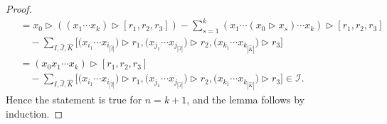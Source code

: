 \documentclass[10pt,a4paper]{amsart}
\numberwithin{equation}{section}
\begin{document}
\begin{proof}
\begin{gather*}
 \quad {}= x_0 \rhd ( (x_1 \cdots x_k) \rhd [r_1, r_2, r_3]) - \sum_{s=1}^k (x_1 \cdots (x_0 \rhd x_s) \cdots x_k) \rhd [r_1, r_2, r_3] \\
 \qquad {}- \sum_{\hat{I},\hat{J},\hat{K}} \bigl[\bigl(x_{i_1} \cdots x_{i_{|\hat{I}|}}\bigr) \rhd r_1, \bigl(x_{j_1} \cdots x_{j_{|\hat{J}|}}\bigr) \rhd r_2, \bigl(x_{k_1} \cdots x_{k_{|\hat{K}|}}\bigr) \rhd r_3\bigr] \\
 \quad {}= (x_0x_1 \cdots x_k) \rhd [r_1, r_2, r_3] \\
 \qquad {}- \sum_{\hat{I},\hat{J},\hat{K}} \bigl[\bigr(x_{i_1} \cdots x_{i_{|\hat{I}|}}\bigr) \rhd r_1, \bigl(x_{j_1} \cdots x_{j_{|\hat{J}|}}\bigr) \rhd r_2, \bigl(x_{k_1} \cdots x_{k_{|\hat{K}|}}\bigr) \rhd r_3\bigr] \in \mathcal{I}.
\end{gather*}
Hence the statement is true for $n=k+1$, and the lemma follows by induction.
\end{proof}
\end{document}
